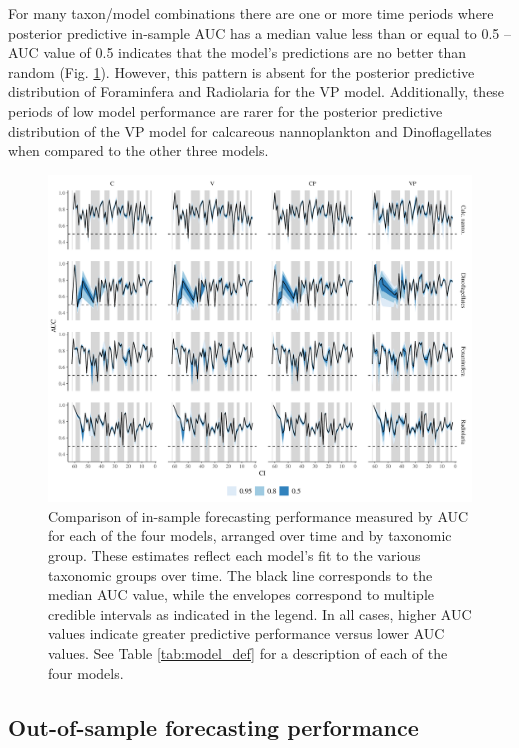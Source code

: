 \documentclass[12pt,letterpaper]{article}
\begin{document}
\begin{refsection}
For many taxon/model combinations there are one or more time periods where posterior predictive in-sample AUC has a median value less than or equal to 0.5 -- AUC value of 0.5 indicates that the model's predictions are no better than random (Fig. \ref{fig:auc_taxon_time}). However, this pattern is absent for the posterior predictive distribution of Foraminfera and Radiolaria for the VP model. Additionally, these periods of low model performance are rarer for the posterior predictive distribution of the VP model for calcareous nannoplankton and Dinoflagellates when compared to the other three models.
\begin{figure}[ht]
  \centering
  \includegraphics[width=\textwidth,height=0.5\textheight,keepaspectratio=true]{../results/figure/auc_taxon_time_full}
  \caption{Comparison of in-sample forecasting performance measured by AUC for each of the four models, arranged over time and by taxonomic group. These estimates reflect each model's fit to the various taxonomic groups over time. The black line corresponds to the median AUC value, while the envelopes correspond to multiple credible intervals as indicated in the legend. In all cases, higher AUC values indicate greater predictive performance versus lower AUC values. See Table \ref{tab:model_def} for a description of each of the four models.}
  \label{fig:auc_taxon_time}
\end{figure}




\subsection{Out-of-sample forecasting performance}


\end{refsection}
\end{document}
